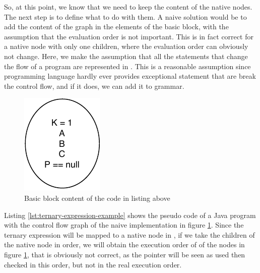 So, at this point, we know that we need to keep the content of the native nodes. 
The next step is to define what to do with them. 
A naive solution would be to add the content of the graph in the elements of the basic block, with the assumption that the evaluation order is not important. 
This is in fact correct for a native node with only one children, where the evaluation order can obviously not change. 
Here, we make the assumption that all the statements that change the flow of a program are represented in \slang{}. 
This is a reasonable assumption since programming language hardly ever provides exceptional statement that are break the control flow, and if it does, we can add it to \slang{} grammar.



\begin{figure}[h]
	\caption{Basic block content of the code in listing above}
	\label{figure:basic-block-content}
	\includegraphics[]{figure/basic-block-content.pdf}
\end{figure}


Listing \ref{lst:ternary-expression-example} shows the pseudo code of a Java program with the control flow graph of the naive implementation in figure \ref{figure:basic-block-content}.
Since the ternary expression will be mapped to a native node in \slang{}, if we take the children of the native node in order, we will obtain the execution order of of the nodes in figure \ref{figure:basic-block-content}, that is obviously not correct, as the pointer will be seen as used then checked in this order, but not in the real execution order.

